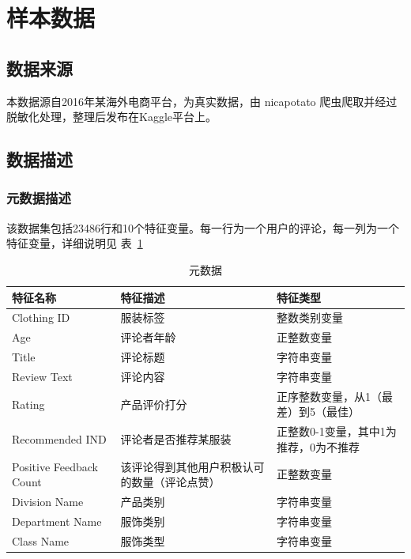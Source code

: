 \documentclass[
  journal=medium,
  manuscript=article-type,
  year=2023,
  volume=37,
]{cup-journal}
\begin{document}
\section{样本数据}

\subsection{数据来源}

本数据源自2016年某海外电商平台，为真实数据，由 nicapotato 爬虫爬取并经过脱敏化处理，整理后发布在Kaggle平台上。

\subsection{数据描述}

\subsubsection{元数据描述}

该数据集包括23486行和10个特征变量。每一行为一个用户的评论，每一列为一个特征变量，详细说明见 表~\ref{attribute}

\begin{table}[hbt!]
    \begin{threeparttable}
    \caption{元数据}
    \label{attribute}
    \begin{tabular}{lll}
    \toprule
    \headrow 特征名称 & 特征描述 & 特征类型\\
    \midrule
    Clothing ID & 服装标签 & 整数类别变量 \\ 
    \midrule
    Age & 评论者年龄 & 正整数变量\\ 
    \midrule
    Title & 评论标题 & 字符串变量\\ 
    \midrule
    Review Text & 评论内容 & 字符串变量\\ 
    \midrule
    Rating & 产品评价打分 & 正序整数变量，从1（最差）到5（最佳）\\ 
    \midrule
    Recommended IND & 评论者是否推荐某服装 & 正整数0-1变量，其中1为推荐，0为不推荐\\ 
    \midrule
    Positive Feedback Count & 该评论得到其他用户积极认可的数量（评论点赞） & 正整数变量\\ 
    \midrule
    Division Name & 产品类别 & 字符串变量\\ 
    \midrule
    Department Name & 服饰类别 & 字符串变量\\ 
    \midrule
    Class Name & 服饰类型 & 字符串变量\\ 
    \bottomrule 
    \end{tabular}
    \end{threeparttable}
\end{table}
    
\end{document}
